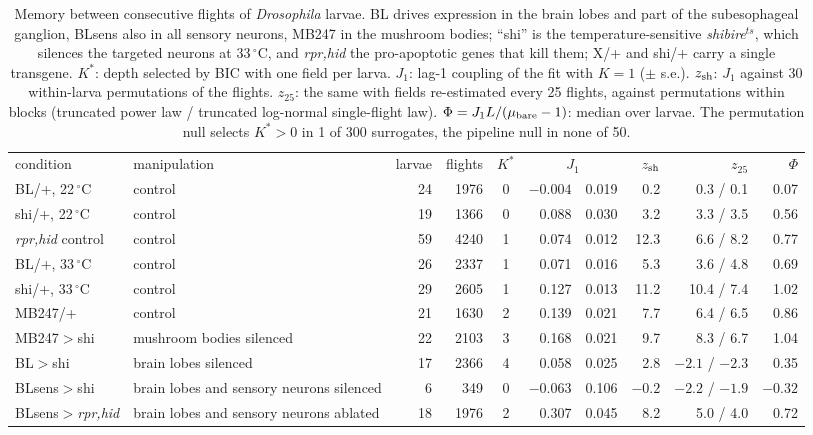 \begin{table}[t]
\caption{Memory between consecutive flights of \emph{Drosophila} larvae. BL drives expression in the brain lobes and part of the subesophageal ganglion, BLsens also in all sensory neurons, MB247 in the mushroom bodies; ``shi'' is the temperature-sensitive \emph{shibire}$^{ts}$, which silences the targeted neurons at 33\,$^\circ$C, and \emph{rpr,hid} the pro-apoptotic genes that kill them; X/+ and shi/+ carry a single transgene. $K^*$: depth selected by BIC with one field per larva. $J_1$: lag-1 coupling of the fit with $K=1$ ($\pm$ s.e.). $z_{\rm sh}$: $J_1$ against 30 within-larva permutations of the flights. $z_{25}$: the same with fields re-estimated every 25 flights, against permutations within blocks (truncated power law / truncated log-normal single-flight law). $\Phi=J_1L/(\mu_{\rm bare}-1)$: median over larvae. The permutation null selects $K^*>0$ in 1 of 300 surrogates, the pipeline null in none of 50.}
\label{tab:larvae}
\begin{ruledtabular}
\begin{tabular}{llrrcr@{\,$\pm$\,}lrrr}
condition & manipulation & larvae & flights & $K^*$ & \multicolumn{2}{c}{$J_1$} & $z_{\rm sh}$ & $z_{25}$ & $\Phi$\\
\colrule
BL/+, 22\,$^\circ$C & control & 24 & 1976 & 0 & $-0.004$ & 0.019 & 0.2 & 0.3 / 0.1 & 0.07\\
shi/+, 22\,$^\circ$C & control & 19 & 1366 & 0 & 0.088 & 0.030 & 3.2 & 3.3 / 3.5 & 0.56\\
\emph{rpr,hid} control & control & 59 & 4240 & 1 & 0.074 & 0.012 & 12.3 & 6.6 / 8.2 & 0.77\\
BL/+, 33\,$^\circ$C & control & 26 & 2337 & 1 & 0.071 & 0.016 & 5.3 & 3.6 / 4.8 & 0.69\\
shi/+, 33\,$^\circ$C & control & 29 & 2605 & 1 & 0.127 & 0.013 & 11.2 & 10.4 / 7.4 & 1.02\\
MB247/+ & control & 21 & 1630 & 2 & 0.139 & 0.021 & 7.7 & 6.4 / 6.5 & 0.86\\
MB247$>$shi & mushroom bodies silenced & 22 & 2103 & 3 & 0.168 & 0.021 & 9.7 & 8.3 / 6.7 & 1.04\\
BL$>$shi & brain lobes silenced & 17 & 2366 & 4 & 0.058 & 0.025 & 2.8 & $-2.1$ / $-2.3$ & 0.35\\
BLsens$>$shi & brain lobes and sensory neurons silenced & 6 & 349 & 0 & $-0.063$ & 0.106 & $-0.2$ & $-2.2$ / $-1.9$ & $-0.32$\\
BLsens$>$\emph{rpr,hid} & brain lobes and sensory neurons ablated & 18 & 1976 & 2 & 0.307 & 0.045 & 8.2 & 5.0 / 4.0 & 0.72\\
\end{tabular}
\end{ruledtabular}
\end{table}

